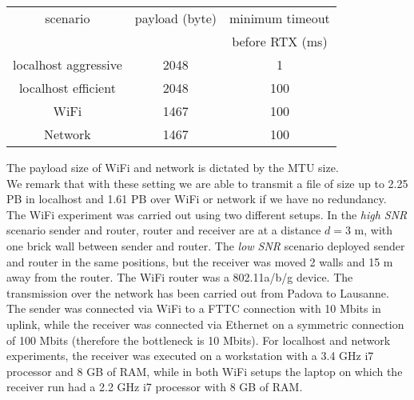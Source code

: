 \begin{center}
\begin{tabular}{ccc}

\toprule
scenario& payload (byte) &minimum timeout\\
& & before RTX (ms) \\
\midrule
localhost aggressive&2048&1\\
localhost efficient&2048&100\\
WiFi&1467&100\\
Network&1467&100\\
\bottomrule
\end{tabular}
\end{center}
The payload size of WiFi and network is dictated by the MTU size. \\
We remark that with these setting we are able to transmit a file of size up to 2.25 PB in localhost and 1.61 PB over WiFi or network if we have no redundancy.\\
The WiFi experiment was carried out using two different setups. In the \textit{high SNR} scenario sender and router, router and receiver are at a distance $d= 3$ m, with one brick wall between sender and router. The \textit{low SNR} scenario deployed sender and router in the same positions, but the receiver was moved 2 walls and 15 m away from the router. The WiFi router was a 802.11a/b/g device. 
The transmission over the network has been carried out from Padova to Lausanne. The sender was connected via WiFi to a FTTC connection with 10 Mbits in uplink, while the receiver was connected via Ethernet on a symmetric connection of 100 Mbits (therefore the bottleneck is 10 Mbits). For localhost and network experiments, the receiver was executed on a workstation with a 3.4 GHz i7 processor and 8 GB of RAM, while in both WiFi setups the laptop on which the receiver run had a 2.2 GHz i7 processor with 8 GB of RAM.

